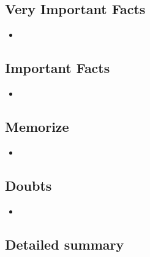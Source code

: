 \documentclass{article}
\begin{document}
\subsection{Very Important Facts}

    \begin{itemize}

    \item 
    
    \end{itemize}

\subsection{Important Facts}

    \begin{itemize}

    \item 
    
    \end{itemize}

\subsection{Memorize}

    \begin{itemize}

    \item 
    
    \end{itemize}

\subsection{Doubts}

    \begin{itemize}

    \item 
    
    \end{itemize}

\subsection{Detailed summary}
\end{document}
